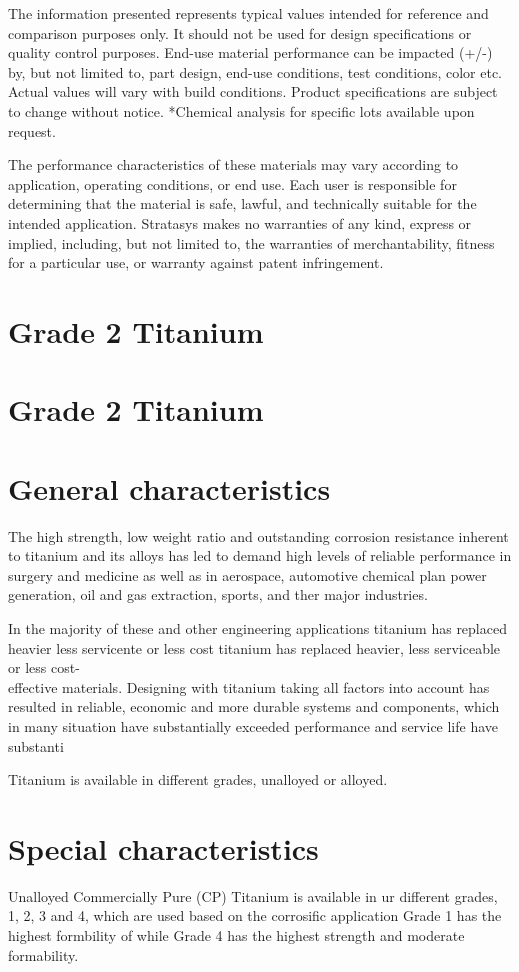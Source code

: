 \documentclass[10pt]{article}
\begin{document}
The information presented represents typical values intended for reference and comparison purposes only. It should not be used for design specifications or quality control purposes. End-use material performance can be impacted (+/-) by, but not limited to, part design, end-use conditions, test conditions, color etc. Actual values will vary with build conditions. Product specifications are subject to change without notice. *Chemical analysis for specific lots available upon request.

The performance characteristics of these materials may vary according to application, operating conditions, or end use. Each user is responsible for determining that the material is safe, lawful, and technically suitable for the intended application. Stratasys makes no warranties of any kind, express or implied, including, but not limited to, the warranties of merchantability, fitness for a particular use, or warranty against patent infringement.

\section*{Grade 2 Titanium}
\section*{Grade 2 Titanium}
\section*{General characteristics}
The high strength, low weight ratio and outstanding corrosion resistance inherent to titanium and its alloys has led to demand high levels of reliable performance in surgery and medicine as well as in aerospace, automotive chemical plan power generation, oil and gas extraction, sports, and ther major industries.

In the majority of these and other engineering applications titanium has replaced heavier less servicente or less cost titanium has replaced heavier, less serviceable or less cost-\\
effective materials. Designing with titanium taking all factors into account has resulted in reliable, economic and more durable systems and components, which in many situation have substantially exceeded performance and service life have substanti

Titanium is available in different grades, unalloyed or alloyed.

\section*{Special characteristics}
Unalloyed Commercially Pure (CP) Titanium is available in ur different grades, 1, 2, 3 and 4, which are used based on the corrosific application Grade 1 has the highest formbility of while Grade 4 has the highest strength and moderate formability.
\end{document}

